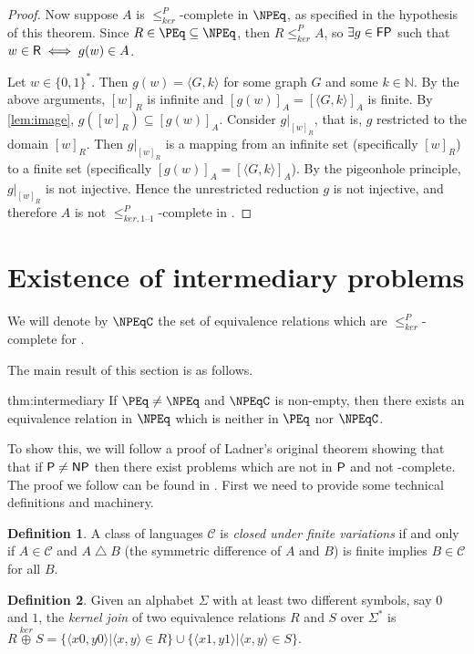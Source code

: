 \documentclass{article}
\theoremstyle{definition} \newtheorem{definition}[definition]{Definition}
\newcommand{\sigmastar}{\{0, 1\}^{*}} %
\newcommand{\kj}{\overset{ker}{\oplus}} %
\newcommand{\kr}{\leq^{P}_{ker}} %
\newcommand{\kri}{\leq^{P}_{ker,1\text{--}1}} %
\newcommand{\symdiff}{\bigtriangleup} %
\newcommand{\defn}[1]{\emph{#1}} %
\newcommand{\pair}[2]{\langle#1,#2\rangle} %
\newcommand{\printintermediarytheorem}{If $\PEq\neq\NPEq$ and $\NPEqC$ is non-empty, then there exists an equivalence relation in $\NPEq$ which is neither in $\PEq$ nor $\NPEqC$.}
\begin{document}
\begin{proof}
  Now suppose $A$ is $\kr$-complete in $\NPEq$, as specified in the hypothesis of this theorem.
  Since $R\in\PEq\subseteq\NPEq$, then $R\kr A$, so $\exists g\in\FP$ such that $w\in\R\iff g(w)\in A$.

  Let $w\in\sigmastar$.
  Then $g(w)=\pair{G}{k}$ for some graph $G$ and some $k\in\mathbb{N}$.
  By the above arguments, $[w]_R$ is infinite and $[g(w)]_A=[\pair{G}{k}]_A$ is finite.
  By \autoref{lem:image}, $g([w]_R)\subseteq [g(w)]_A$.
  Consider $g|_{[w]_R}$, that is, $g$ restricted to the domain $[w]_R$.
  Then $g|_{[w]_R}$ is a mapping from an infinite set (specifically $[w]_R$) to a finite set (specifically $[g(w)]_A=[\pair{G}{k}]_A$).
  By the pigeonhole principle, $g|_{[w]_R}$ is not injective.
  Hence the unrestricted reduction $g$ is not injective, and therefore $A$ is not $\kri$-complete in \NPEq.
\end{proof}

\section{Existence of intermediary problems}

We will denote by $\NPEqC$ the set of equivalence relations which are $\kr$-complete for \NPEq.

The main result of this section is as follows.
\begin{reptheorem}{thm:intermediary}
  \printintermediarytheorem
\end{reptheorem}
To show this, we will follow a proof of Ladner's original theorem showing that that if $\P\neq\NP$ then there exist problems which are not in $\P$ and not \NP-complete.
The proof we follow can be found in \cite{bdg95}.
First we need to provide some technical definitions and machinery.

\begin{definition}
  A class of languages $\mathcal{C}$ is \defn{closed under finite variations} if and only if $A\in \mathcal{C}$ and $A\symdiff B$ (the symmetric difference of $A$ and $B$) is finite implies $B\in \mathcal{C}$ for all $B$.
\end{definition}

\begin{definition}
  Given an alphabet $\Sigma$ with at least two different symbols, say $0$ and $1$, the \defn{kernel join} of two equivalence relations $R$ and $S$ over $\Sigma^*$ is $R\kj S=\{\pair{x0}{y0}|\pair{x}{y}\in R\}\cup\{\pair{x1}{y1}|\pair{x}{y}\in S\}$.
\end{definition}
\end{document}
